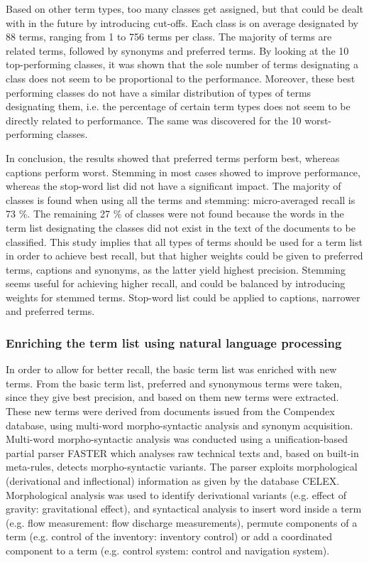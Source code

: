 Based on other term types, too many classes get assigned, but that could be dealt with in the future by introducing cut-offs. 
Each class is on average designated by 88 terms, ranging from 1 to 756 terms per class. The majority of terms are related terms, followed by synonyms and preferred terms. By looking at the 10 top-performing classes, it was shown that the sole number of terms designating a class does not seem to be
proportional to the performance. Moreover, these best performing classes do not have a similar distribution of types of terms designating them, i.e. the percentage of certain term types does not seem to be directly related to performance. The same was discovered for the 10 worst-performing classes.

In conclusion, the results showed that preferred terms perform best, whereas captions perform worst. Stemming in most cases showed to improve performance, whereas the stop-word list did not have a significant impact. The majority of classes is found when using all the terms and stemming: micro-averaged recall is 73 \%. The remaining 27 \% of classes were not found because the words in the term list designating the classes did not exist in the text of the documents to be classified. This study implies that all types of terms should be used for a term list in order to achieve best recall, but that higher weights could be given to preferred terms, captions and synonyms, as the latter yield highest precision. Stemming seems useful for achieving higher recall, and could be balanced by introducing weights for stemmed terms. Stop-word list could be applied to captions, narrower and preferred terms.

\subsubsection{Enriching the term list using natural language processing}
In order to allow for better recall, the basic term list was enriched with new terms. From the basic term list, preferred and synonymous terms were taken, since they give best precision, and based on them new terms were extracted. These new terms were derived from documents issued from the Compendex database, using multi-word morpho-syntactic analysis and synonym acquisition. Multi-word morpho-syntactic analysis was conducted using a unification-based partial parser FASTER which analyses raw technical texts and, based on built-in meta-rules, detects morpho-syntactic variants. The parser exploits morphological (derivational and inflectional) information as given by the database CELEX. Morphological analysis was used to identify derivational variants (e.g. effect of gravity: gravitational effect), and syntactical analysis to insert word inside a term (e.g. flow measurement: flow discharge measurements), permute components of a term (e.g. control of the inventory: inventory control) or add a coordinated component to a term (e.g. control system: control and navigation system). 

